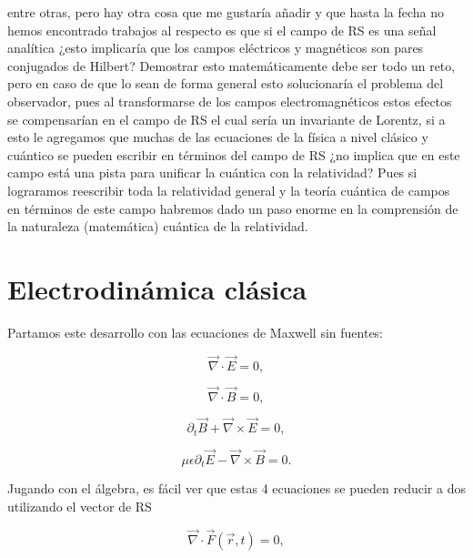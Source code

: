         entre otras, pero hay otra cosa que me gustaría añadir y que hasta la fecha no hemos encontrado trabajos al respecto es que si el campo de RS es una señal analítica ¿esto implicaría que los campos eléctricos y magnéticos son pares conjugados de Hilbert? Demostrar esto matemáticamente debe ser todo un reto, pero en caso de que lo sean de forma general esto solucionaría el problema del observador, pues al transformarse de los campos electromagnéticos estos efectos se compensarían en el campo de RS el cual sería un invariante de Lorentz, si a esto le agregamos que muchas de las ecuaciones de la física a nivel clásico y cuántico se pueden escribir en términos del campo de RS ¿no implica que en este campo está una pista para unificar la cuántica con la relatividad? Pues si lograramos reescribir toda la relatividad general y la teoría cuántica de campos en términos de este campo habremos dado un paso enorme en la comprensión de la naturaleza (matemática) cuántica de la relatividad.
    \section{Electrodinámica clásica}\label{subsec:ElecClasik}

        Partamos este desarrollo con las ecuaciones de Maxwell sin fuentes:

        \begin{equation}
            \Vec{\nabla} \cdot \Vec{E} = 0 ,
        \end{equation}

        \begin{equation}
            \Vec{\nabla} \cdot \Vec{B} = 0 ,
        \end{equation}

        \begin{equation}
            \partial_t \Vec{B} + \Vec{\nabla}\times\Vec{E} = 0,
        \end{equation}

        \begin{equation}
            \mu\epsilon\partial_t \Vec{E} - \Vec{\nabla}\times \Vec{B} = 0.
        \end{equation}

        Jugando con el álgebra, es fácil ver que estas 4 ecuaciones se pueden reducir a dos utilizando el vector de RS

        \begin{equation}
            \Vec{\nabla}\cdot\Vec{F}(\Vec{r},t) = 0,
        \end{equation}

